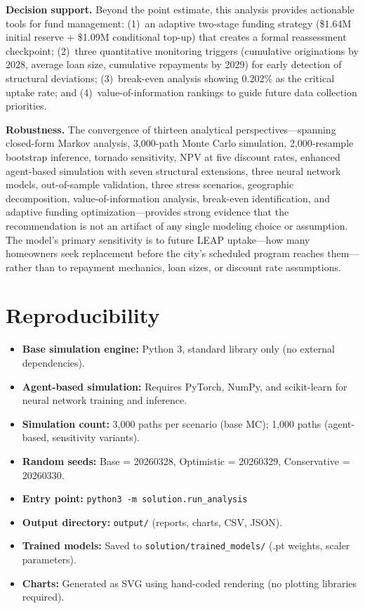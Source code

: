 \documentclass[11pt, letterpaper]{article}
\begin{document}
\textbf{Decision support.} Beyond the point estimate, this analysis provides actionable tools for fund management: (1)~an adaptive two-stage funding strategy (\$1.64M initial reserve + \$1.09M conditional top-up) that creates a formal reassessment checkpoint; (2)~three quantitative monitoring triggers (cumulative originations by 2028, average loan size, cumulative repayments by 2029) for early detection of structural deviations; (3)~break-even analysis showing 0.202\% as the critical uptake rate; and (4)~value-of-information rankings to guide future data collection priorities.

\textbf{Robustness.} The convergence of thirteen analytical perspectives---spanning closed-form Markov analysis, 3{,}000-path Monte Carlo simulation, 2{,}000-resample bootstrap inference, tornado sensitivity, NPV at five discount rates, enhanced agent-based simulation with seven structural extensions, three neural network models, out-of-sample validation, three stress scenarios, geographic decomposition, value-of-information analysis, break-even identification, and adaptive funding optimization---provides strong evidence that the recommendation is not an artifact of any single modeling choice or assumption. The model's primary sensitivity is to future LEAP uptake---how many homeowners seek replacement before the city's scheduled program reaches them---rather than to repayment mechanics, loan sizes, or discount rate assumptions.

\appendix

\section{Reproducibility}

\begin{itemize}[nosep]
  \item \textbf{Base simulation engine:} Python 3, standard library only (no external dependencies).
  \item \textbf{Agent-based simulation:} Requires PyTorch, NumPy, and scikit-learn for neural network training and inference.
  \item \textbf{Simulation count:} 3{,}000 paths per scenario (base MC); 1{,}000 paths (agent-based, sensitivity variants).
  \item \textbf{Random seeds:} Base = 20260328, Optimistic = 20260329, Conservative = 20260330.
  \item \textbf{Entry point:} \texttt{python3 -m solution.run\_analysis}
  \item \textbf{Output directory:} \texttt{output/} (reports, charts, CSV, JSON).
  \item \textbf{Trained models:} Saved to \texttt{solution/trained\_models/} (.pt weights, scaler parameters).
  \item \textbf{Charts:} Generated as SVG using hand-coded rendering (no plotting libraries required).
\end{itemize}
\end{document}
